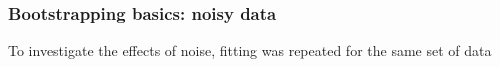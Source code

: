 \subsubsection{Bootstrapping basics: noisy data}

To investigate the effects of noise, fitting was repeated for the same set of data